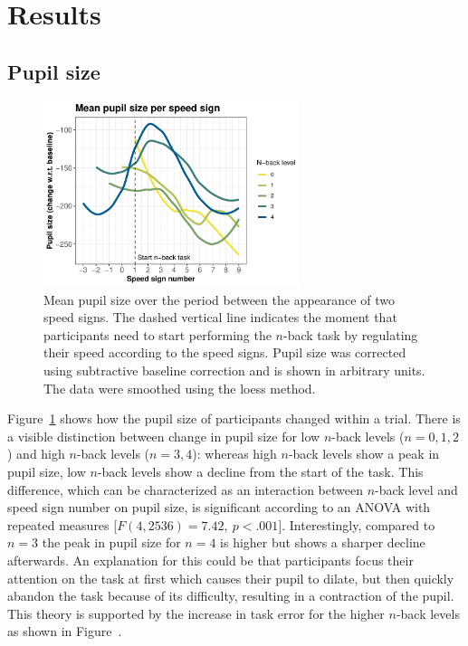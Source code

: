 
\section{Results}\label{sec:results}
\subsection{Pupil size}
\begin{figure}[tp]
  \centering
  \includegraphics[width=7.5cm]{images/speed_sign_nback.pdf}
  \caption{Mean pupil size over the period between the appearance of two speed signs.
  The dashed vertical line indicates the moment that participants need to start performing the \(n\)-back task by regulating their speed according to the speed signs.
  Pupil size was corrected using subtractive baseline correction and is shown in arbitrary units. 
  The data were smoothed using the loess method.}
  \label{fig:ps-speed-sign}
\end{figure}

Figure~\ref{fig:ps-speed-sign} shows how the pupil size of participants changed within a trial.
There is a visible distinction between change in pupil size for low \(n\)-back levels (\(n = 0,1,2\)) and high \(n\)-back levels (\(n = 3,4\)):
whereas high \(n\)-back levels show a peak in pupil size, low \(n\)-back levels show a decline from the start of the task.
This difference, which can be characterized as an interaction between \(n\)-back level and speed sign number on pupil size, is significant according to an ANOVA with repeated measures [\(F(4,2536)=7.42,\ p < .001\)].
Interestingly, compared to \(n = 3\) the peak in pupil size for \(n = 4\) is higher but shows a sharper decline afterwards.
An explanation for this could be that participants focus their attention on the task at first which causes their pupil to dilate, but then quickly abandon the task because of its difficulty, resulting in a contraction of the pupil.
This theory is supported by the increase in task error for the higher \(n\)-back levels as shown in Figure~.


